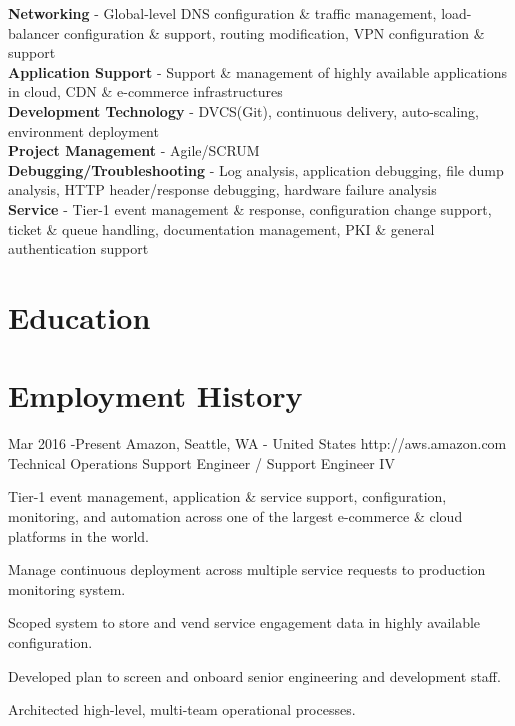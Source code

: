 \documentclass[10pt]{article} %
\begin{document}

{
\textbf{Networking} - Global-level DNS configuration \& traffic management, load-balancer configuration \& support, routing modification, VPN configuration \& support  \\
\textbf{Application Support} - Support \& management of highly available applications in cloud, CDN \& e-commerce infrastructures\\
\textbf{Development Technology} - DVCS(Git), continuous delivery, auto-scaling, environment deployment\\
\textbf{Project Management} - Agile/SCRUM\\
\textbf{Debugging/Troubleshooting} - Log analysis, application debugging, file dump analysis, HTTP header/response debugging, hardware failure analysis \\
\textbf{Service} - Tier-1 event management \& response, configuration change support, ticket \& queue handling, documentation management, PKI \& general authentication support
}


\section{Education}



\section{Employment History}
	
\job
{Mar 2016 -}{Present}
{Amazon, Seattle, WA - United States}
{http://aws.amazon.com}
{Technical Operations Support Engineer / Support Engineer IV}
{
\begin{itemize-noindent}
\item{Tier-1 event management, application \& service support, configuration, monitoring, and automation across one of the largest e-commerce \& cloud platforms in the world.}
\item{Manage continuous deployment across multiple service requests to production monitoring system.}
\item{Scoped system to store and vend service engagement data in highly available configuration.}
\item{Developed plan to screen and onboard senior engineering and development staff.}
\item{Architected high-level, multi-team operational processes.}
\end{itemize-noindent}

}
\end{document}
